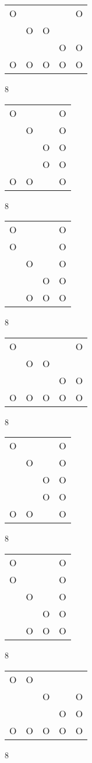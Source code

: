 \begin{tabular}{|m{0.2cm}m{0.2cm}m{0.2cm}m{0.2cm}m{0.2cm}|}\hline
O& & & &O\\
 &O&O& & \\
 & & &O&O\\
O&O&O&O&O\\
\hline\end{tabular}8
\begin{tabular}{|m{0.2cm}m{0.2cm}m{0.2cm}m{0.2cm}|}\hline
O& & &O\\
 &O& &O\\
 & &O&O\\
 & &O&O\\
O&O& &O\\
\hline\end{tabular}8
\begin{tabular}{|m{0.2cm}m{0.2cm}m{0.2cm}m{0.2cm}|}\hline
O& & &O\\
O& & &O\\
 &O& &O\\
 & &O&O\\
 &O&O&O\\
\hline\end{tabular}8
\begin{tabular}{|m{0.2cm}m{0.2cm}m{0.2cm}m{0.2cm}m{0.2cm}|}\hline
O& & & &O\\
 &O&O& & \\
 & & &O&O\\
O&O&O&O&O\\
\hline\end{tabular}8
\begin{tabular}{|m{0.2cm}m{0.2cm}m{0.2cm}m{0.2cm}|}\hline
O& & &O\\
 &O& &O\\
 & &O&O\\
 & &O&O\\
O&O& &O\\
\hline\end{tabular}8
\begin{tabular}{|m{0.2cm}m{0.2cm}m{0.2cm}m{0.2cm}|}\hline
O& & &O\\
O& & &O\\
 &O& &O\\
 & &O&O\\
 &O&O&O\\
\hline\end{tabular}8
\begin{tabular}{|m{0.2cm}m{0.2cm}m{0.2cm}m{0.2cm}m{0.2cm}|}\hline
O&O& & & \\
 & &O& &O\\
 & & &O&O\\
O&O&O&O&O\\
\hline\end{tabular}8
